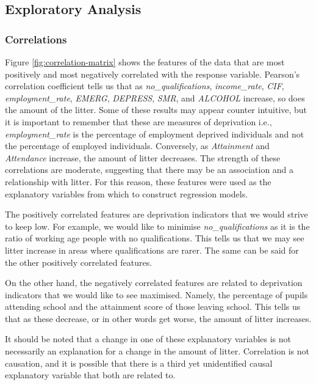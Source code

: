 \documentclass{thesis}
\begin{document}
\subsection{Exploratory Analysis}

\subsubsection{Correlations}

Figure \ref{fig:correlation-matrix} shows the features of the data that are most positively and most negatively correlated with the response variable. Pearson's correlation coefficient tells us that as \textit{no\_qualifications}, \textit{income\_rate}, \textit{CIF}, \textit{employment\_rate}, \textit{EMERG}, \textit{DEPRESS}, \textit{SMR}, and \textit{ALCOHOL} increase, so does the amount of the litter. Some of these results may appear counter intuitive, but it is important to remember that these are measures of deprivation i.e., \textit{employment\_rate} is the percentage of employment deprived individuals and not the percentage of employed individuals. Conversely, as \textit{Attainment} and \textit{Attendance} increase, the amount of litter decreases. The strength of these correlations are moderate, suggesting that there may be an association and a relationship with litter. For this reason, these features were used as the explanatory variables from which to construct regression models.

The positively correlated features are deprivation indicators that we would strive to keep low. For example, we would like to minimise \textit{no\_qualifications} as it is the ratio of working age people with no qualifications. This tells us that we may see litter increase in areas where qualifications are rarer. The same can be said for the other positively correlated features.

On the other hand, the negatively correlated features are related to deprivation indicators that we would like to see maximised. Namely, the percentage of pupils attending school and the attainment score of those leaving school. This tells us that as these decrease, or in other words get worse, the amount of litter increases.

It should be noted that a change in one of these explanatory variables is not necessarily an explanation for a change in the amount of litter. Correlation is not causation, and it is possible that there is a third yet unidentified causal explanatory variable that both are related to.
\end{document}
